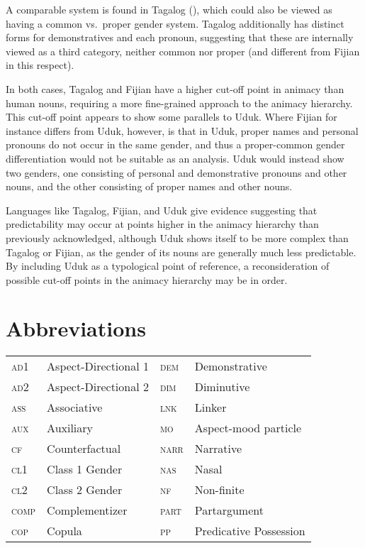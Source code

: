 \documentclass[output=collectionpaper,hidelinks]{langscibook}
\theoremstyle{remark}
\begin{document}
A comparable system is found in Tagalog (), which could also be viewed as having a
common vs.\ proper gender system.  Tagalog additionally has distinct forms for
demonstratives and each pronoun, suggesting that these are internally viewed as
a third category, neither common nor proper (and different from Fijian in this
respect).

In both cases, Tagalog and Fijian have a higher cut-off point in animacy than
human nouns, requiring a more fine-grained approach to the animacy hierarchy.
This cut-off point appears to show some parallels to Uduk.  Where Fijian for
instance differs from Uduk, however, is that in Uduk, proper names and personal
pronouns do not occur in the same gender, and thus a proper-common gender
differentiation would not be suitable as an analysis.  Uduk would instead show
two genders, one consisting of personal and demonstrative pronouns and other
nouns, and the other consisting of proper names and other nouns.

Languages like Tagalog, Fijian, and Uduk give evidence suggesting that
predictability may occur at points higher in the animacy hierarchy than
previously acknowledged, although Uduk shows itself to be more complex than
Tagalog or Fijian, as the gender of its nouns are generally much less
predictable. By including Uduk as a typological point of reference, a
reconsideration of possible cut-off points in the animacy hierarchy may be in
order.

\section*{Abbreviations}
\begin{tabularx}{\textwidth}{lXlX}
  \textsc{ad1} 	&	 Aspect-Directional 1 	&	\textsc{dem} 	&	 Demonstrative 	\\
  \textsc{ad2} 	&	 Aspect-Directional 2 	&	\textsc{dim} 	&	 Diminutive 	\\
  \textsc{ass} 	&	 Associative 	&	\textsc{lnk} 	&	 Linker 	\\
  \textsc{aux} 	&	 Auxiliary 	&	\textsc{mo} 	&	 Aspect-mood particle 	\\
  \textsc{cf} 	&	 Counterfactual 	&	\textsc{narr} 	&	 Narrative 	\\
  \textsc{cl1} 	&	 Class 1 Gender 	&	\textsc{nas} 	&	 Nasal 	\\
  \textsc{cl2} 	&	 Class 2 Gender 	&	\textsc{nf} 	&	 Non-finite 	\\
  \textsc{comp} 	&	 Complementizer 	&	\textsc{part} 	&	 Partargument 	\\
  \textsc{cop} 	&	 Copula 	&	\textsc{pp} 	&	 Predicative Possession 	\\
\end{tabularx}
\end{document}
